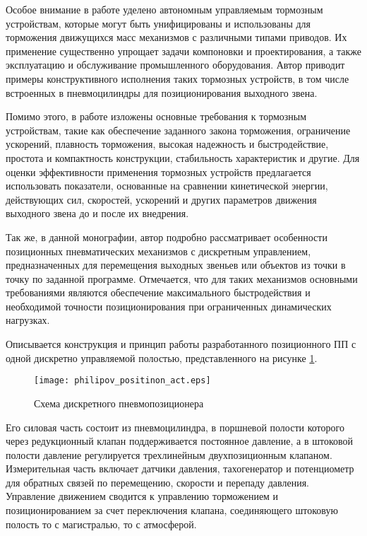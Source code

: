 Особое внимание в работе уделено автономным управляемым тормозным устройствам, которые могут быть унифицированы
и использованы для торможения движущихся масс механизмов с различными типами приводов. Их применение существенно
упрощает задачи компоновки и проектирования, а также эксплуатацию и обслуживание промышленного оборудования.
Автор приводит примеры конструктивного исполнения таких тормозных устройств, в том числе встроенных в пневмоцилиндры
для позиционирования выходного звена.

Помимо этого, в работе изложены основные требования к тормозным устройствам, такие как обеспечение заданного закона
торможения, ограничение ускорений, плавность торможения, высокая надежность и быстродействие, простота и компактность
конструкции, стабильность характеристик и другие. Для оценки эффективности применения тормозных устройств предлагается
использовать показатели, основанные на сравнении кинетической энергии, действующих сил, скоростей, ускорений и других
параметров движения выходного звена до и после их внедрения.

Так же, в данной монографии, автор подробно рассматривает особенности позиционных пневматических механизмов
с дискретным управлением, предназначенных для перемещения выходных звеньев или объектов из точки в точку по
заданной программе. Отмечается, что для таких механизмов основными требованиями являются обеспечение максимального
быстродействия и необходимой точности позиционирования при ограниченных динамических нагрузках.

Описывается конструкция и принцип работы разработанного позиционного ПП с одной дискретно управляемой полостью, представленного
на рисунке \cref*{fig:позиционный_пп_филипов}.

\begin{figure}[h]
    \centerfloat
    \texttt{[image: philipov\_positinon\_act.eps]}
    \caption{Схема дискретного пневмопозиционера}\label{fig:позиционный_пп_филипов}
\end{figure}

Его силовая часть состоит из пневмоцилиндра, в поршневой полости которого через редукционный клапан поддерживается
постоянное давление, а в штоковой полости давление регулируется трехлинейным двухпозиционным клапаном. Измерительная
часть включает датчики давления, тахогенератор и потенциометр для обратных связей по перемещению, скорости и перепаду
давления. Управление движением сводится к управлению торможением и позиционированием за счет переключения клапана,
соединяющего штоковую полость то с магистралью, то с атмосферой.

